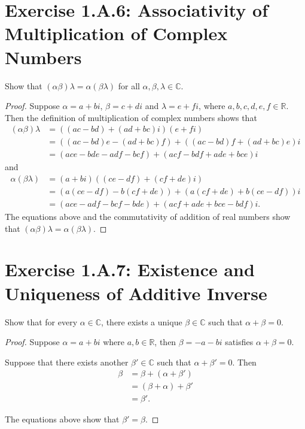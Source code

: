 \section{Exercise 1.A.6: Associativity of Multiplication of Complex Numbers}
Show that $(\alpha\beta)\lambda=\alpha(\beta\lambda)$ for all $\alpha,\beta,\lambda\in\mathbb{C}$.\begin{proof}
Suppose $\alpha=a+bi$, $\beta=c+di$ and $\lambda=e+fi$, where $a,b,c,d,e,f\in\mathbb{R}$. Then the definition of multiplication of complex numbers shows that
\begin{equation*}
\begin{split}
(\alpha\beta)\lambda&=((ac-bd)+(ad+bc)i)(e+fi)\\
&=((ac-bd)e-(ad+bc)f)+((ac-bd)f+(ad+bc)e)i\\
&=(ace-bde-adf-bcf)+(acf-bdf+ade+bce)i
\end{split}
\end{equation*}
and
\begin{equation*}
\begin{split}
\alpha(\beta\lambda)&=(a+bi)((ce-df)+(cf+de)i)\\
&=(a(ce-df)-b(cf+de))+(a(cf+de)+b(ce-df))i\\
&=(ace-adf-bcf-bde)+(acf+ade+bce-bdf)i.
\end{split}
\end{equation*}
The equations above and the commutativity of addition of real numbers show that $(\alpha\beta)\lambda=\alpha(\beta\lambda)$.
\end{proof}

\section{Exercise 1.A.7: Existence and Uniqueness of Additive Inverse}
Show that for every $\alpha\in\mathbb{C}$, there exists a unique $\beta\in\mathbb{C}$ such that $\alpha+\beta=0$.
\begin{proof}
Suppose $\alpha=a+bi$ where $a,b\in\mathbb{R}$, then $\beta=-a-bi$ satisfies $\alpha+\beta=0$.

Suppose that there exists another $\beta'\in\mathbb{C}$ such that $\alpha+\beta'=0$. Then
\begin{equation*}
\begin{split}
\beta&=\beta+(\alpha+\beta')\\
&=(\beta+\alpha)+\beta'\\
&=\beta'.
\end{split}
\end{equation*}

The equations above show that $\beta'=\beta$.
\end{proof}


